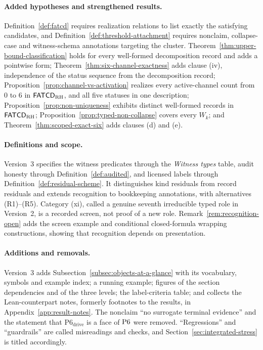 \paragraph{Added hypotheses and strengthened results.}
Definition~\ref{def:fatcd} requires realization relations to list exactly the
satisfying candidates, and Definition~\ref{def:threshold-attachment} requires
nonclaim, collapse-case and witness-schema annotations targeting the cluster.
Theorem~\ref{thm:upper-bound-classification} holds for every well-formed
decomposition record and adds a pointwise form;
Theorem~\ref{thm:six-channel-exactness} adds clause (iv), independence of the
status sequence from the decomposition record;
Proposition~\ref{prop:channel-vs-activation} realizes every active-channel
count from \(0\) to \(6\) in \(\mathsf{FATCD}_{\mathrm{RH}}\), and all five
statuses in one description; Proposition~\ref{prop:non-uniqueness}
exhibits distinct well-formed records in \(\mathsf{FATCD}_{\mathrm{RH}}\); Proposition~\ref{prop:typed-non-collapse}
covers every \(W_k\); and Theorem~\ref{thm:scoped-exact-six} adds clauses (d)
and (e).

\paragraph{Definitions and scope.} Version~3 specifies the witness
predicates through the \emph{Witness types} table, audit honesty through
Definition~\ref{def:audited}, and licensed labels through
Definition~\ref{def:residual-scheme}. It distinguishes kind residuals
from record residuals and extends recognition to bookkeeping annotations,
with alternatives (R1)--(R5). Category (xi), called a genuine seventh
irreducible typed role in Version~2, is a recorded screen, not proof
of a new role. Remark~\ref{rem:recognition-open} adds the screen example
and conditional closed-formula wrapping constructions, showing that
recognition depends on presentation.

\paragraph{Additions and removals.} Version~3 adds Subsection~\ref{subsec:objects-at-a-glance}
with its vocabulary, symbols and example index; a running example; figures of
the section dependencies and of the three levels; the label-criteria table;
and collects the Lean-counterpart notes, formerly footnotes to the
results, in Appendix~\ref{app:result-notes}. The
nonclaim ``no surrogate terminal evidence'' and the statement that
\(\mathrm{P6}_{\mathrm{drive}}\) is a face of \(\mathrm{P6}{}\) were removed.
``Regressions'' and ``guardrails'' are called misreadings and checks, and
Section~\ref{sec:integrated-stress} is titled accordingly.

